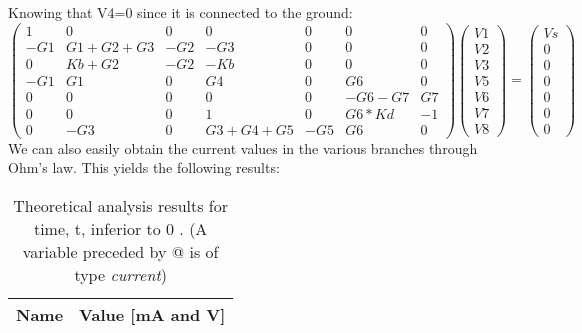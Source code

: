 Knowing that V4=0 since it is connected to the ground:
\begin{equation}
\begin{pmatrix}
1 & 0 & 0 & 0 & 0 & 0 & 0\\
-G1 & G1+G2+G3 & -G2 & -G3 & 0 & 0 & 0\\
0 & Kb+G2 & -G2 & -Kb & 0 & 0 & 0\\
-G1 & G1 & 0 & G4 & 0 & G6 & 0\\
0 & 0 & 0 & 0 & 0 & -G6-G7 & G7\\
0 & 0 & 0 & 1 & 0 & G6*Kd & -1\\
0 & -G3 & 0 & G3+G4+G5 & -G5 & G6 & 0
\end{pmatrix}
\begin{pmatrix}
V1\\
V2\\
V3\\
V5\\
V6\\
V7\\
V8
\end{pmatrix}
=
\begin{pmatrix}
Vs\\
0\\
0\\
0\\
0\\
0\\
0
\end{pmatrix}
\end{equation}
We can also easily obtain the current values in the various branches through Ohm's law. This yields the following results:
\begin{table}[h]
  \centering
  \begin{tabular}{|l|r|}
    \hline    
    {\bf Name} & {\bf Value [mA and V]} \\ \hline
     
  \end{tabular}
  \caption{Theoretical analysis results for time, t, inferior to 0 . (A variable preceded by @ is of type {\em current})}
  \label{tab:nodal}
\end{table}

